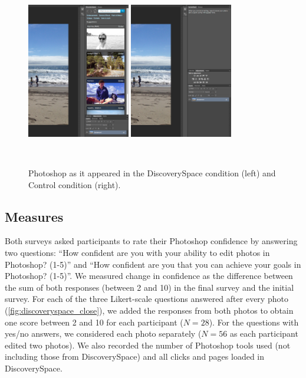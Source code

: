 \begin{figure}
\centering
  \includegraphics[width=0.4\textwidth]{discoveryspace/figures/experiment-DS.png}
  \includegraphics[width=0.4\textwidth]{discoveryspace/figures/experiment-C.png}
  \caption{Photoshop as it appeared in the DiscoverySpace condition (left) and Control condition (right).}~\label{fig:discoveryspace_exp_interface}
\end{figure}

\subsection{Measures}
Both surveys asked participants to rate their Photoshop confidence by answering two questions: ``How confident are you with your ability to edit photos in Photoshop? (1-5)'' and ``How confident are you that you can achieve your goals in Photoshop? (1-5)''. We measured change in confidence as the difference between the sum of both responses (between 2 and 10) in the final survey and the initial survey. For each of the three Likert-scale questions answered after every photo (\autoref{fig:discoveryspace_close}), we added the responses from both photos to obtain one score between 2 and 10 for each participant ($N = 28$). For the questions with yes/no answers, we considered each photo separately ($N = 56$ as each participant edited two photos). We also recorded the number of Photoshop tools used (not including those from Discovery\-Space) and all clicks and pages loaded in Discovery\-Space.

